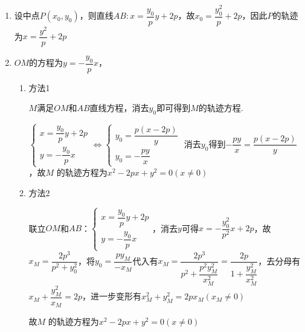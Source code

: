 \begin{enumerate}
\begin{jieda}
\begin{enumerate}
            此时直线 ${AB}$ 的方程为 $x - \dfrac{{y}_{1}^{2}}{2p} = \dfrac{{y}_{1} + {y}_{2}}{2p}\left( y - y_1\right)$ . 即 $y\left( {{y}_{1} + {y}_{2}}\right)  - {y}_{1}{y}_{2} = {2px}$ . 

            由上一问可知${y}_{1}{y}_{2} =  - 4{p}^{2}$，故直线方程为$y\left( {{y}_{1} + {y}_{2}}\right)  +4p^2 = {2px}$，即$x = \dfrac{y_1+y_2}{2p} y + 2p$，过定点$(2p, 0)$
            \item 设中点$P(x_0, y_0)$，则直线$AB: x = \dfrac{y_0}{p} y + 2p$，故$x_0 = \dfrac{y_0^2}{p}+2p$，因此$P$的轨迹为$x = \dfrac{y^2}{p}+2p$
            \item $OM$的方程为$y = -\dfrac{y_0}{p}x$，
            
            \begin{enumerate}
                \item 方法1

                $M$满足$OM$和$AB$直线方程，消去$y_0$即可得到$M$的轨迹方程.

                $\left\{\begin{array}{l}
                 x = \dfrac{y_0}{p} y + 2p  \\
                 y = -\dfrac{y_0}{p}x 
                \end{array}\right. \Longleftrightarrow \left\{\begin{array}{l}
                 y_0 = \dfrac{p(x-2p)}{y}  \\
                 y_0 = -\dfrac{py}{x} 
                \end{array}\right.$
                消去$y_0$得到$-\dfrac{py}{x} = \dfrac{p(x-2p)}{y}$，故$M$ 的轨迹方程为$x^2 - 2px + y^2 = 0 (x \neq 0)$
                \item 方法2

                联立$OM$和$AB$：$\left\{\begin{array}{l}
                 x = \dfrac{y_0}{p} y + 2p  \\
                 y = -\dfrac{y_0}{p}x 
                \end{array}\right.$，消去$y$可得$x = -\dfrac{y_0^2}{p^2}x + 2p$，故$x_M = \dfrac{2p^3}{p^2+y_0^2}$，将$y_0 = \dfrac{py_M}{-x_M}$代入有$x_M = \dfrac{2p^3}{p^2+\dfrac{p^2y_M^2}{x_M^2}} = \dfrac{2p}{1+\dfrac{y_M^2}{x_M^2}}$，去分母有$x_M + \dfrac{y_M^2}{x_M} = 2p$，进一步变形有$x_M^2 + y_M^2 = 2px_M (x_M \neq 0)$
    
                故$M$ 的轨迹方程为$x^2 - 2px + y^2 = 0 (x \neq 0)$
            \end{enumerate}
        \end{enumerate}
    \end{jieda}
    

\end{enumerate}
